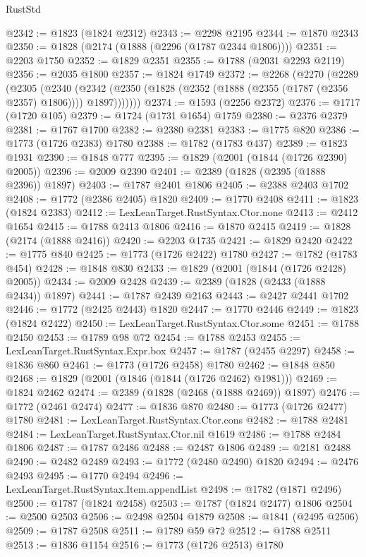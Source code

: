 \begin{lexlean}{RustStd}
\begin{coremodule}
@2342 := @1823 (@1824 @2312)
@2343 := @2298 @2195
@2344 := @1870 @2343
@2350 := @1828 (@2174 (@1888 (@2296 (@1787 @2344 @1806))))
@2351 := @2203 @1750
@2352 := @1829 @2351
@2355 := @1788 (@2031 @2293 @2119)
@2356 := @2035 @1800
@2357 := @1824 @1749
@2372 := @2268
    (@2270
      (@2289
        (@2305
          (@2340
            (@2342 (@2350 (@1828 (@2352 (@1888 (@2355 (@1787 (@2356 @2357) @1806)))) @1897)))))))
@2374 := @1593 (@2256 @2372)
@2376 := @1717 (@1720 @105)
@2379 := @1724 (@1731 @1654) @1759
@2380 := @2376 @2379
@2381 := @1767 @1700
@2382 := @2380 @2381
@2383 := @1775 @820
@2386 := @1773 (@1726 @2383) @1780
@2388 := @1782 (@1783 @437)
@2389 := @1823 @1931
@2390 := @1848 @777
@2395 := @1829 (@2001 (@1844 (@1726 @2390) @2005))
@2396 := @2009 @2390
@2401 := @2389 (@1828 (@2395 (@1888 @2396)) @1897)
@2403 := @1787 @2401 @1806
@2405 := @2388 @2403 @1702
@2408 := @1772 (@2386 @2405) @1820
@2409 := @1770 @2408
@2411 := @1823 (@1824 @2383)
@2412 := LexLeanTarget.RustSyntax.Ctor.none
@2413 := @2412 @1654
@2415 := @1788 @2413 @1806
@2416 := @1870 @2415
@2419 := @1828 (@2174 (@1888 @2416))
@2420 := @2203 @1735
@2421 := @1829 @2420
@2422 := @1775 @840
@2425 := @1773 (@1726 @2422) @1780
@2427 := @1782 (@1783 @454)
@2428 := @1848 @830
@2433 := @1829 (@2001 (@1844 (@1726 @2428) @2005))
@2434 := @2009 @2428
@2439 := @2389 (@1828 (@2433 (@1888 @2434)) @1897)
@2441 := @1787 @2439 @2163
@2443 := @2427 @2441 @1702
@2446 := @1772 (@2425 @2443) @1820
@2447 := @1770 @2446
@2449 := @1823 (@1824 @2422)
@2450 := LexLeanTarget.RustSyntax.Ctor.some
@2451 := @1788 @2450
@2453 := @1789 @98 @72
@2454 := @1788 @2453
@2455 := LexLeanTarget.RustSyntax.Expr.box
@2457 := @1787 (@2455 @2297)
@2458 := @1836 @860
@2461 := @1773 (@1726 @2458) @1780
@2462 := @1848 @850
@2468 := @1829 (@2001 (@1846 (@1844 (@1726 @2462) @1981)))
@2469 := @1824 @2462
@2474 := @2389 (@1828 (@2468 (@1888 @2469)) @1897)
@2476 := @1772 (@2461 @2474)
@2477 := @1836 @870
@2480 := @1773 (@1726 @2477) @1780
@2481 := LexLeanTarget.RustSyntax.Ctor.cons
@2482 := @1788 @2481
@2484 := LexLeanTarget.RustSyntax.Ctor.nil @1619
@2486 := @1788 @2484 @1806
@2487 := @1787 @2486
@2488 := @2487 @1806
@2489 := @2181 @2488
@2490 := @2482 @2489
@2493 := @1772 (@2480 @2490) @1820
@2494 := @2476 @2493
@2495 := @1770 @2494
@2496 := LexLeanTarget.RustSyntax.Item.appendList
@2498 := @1782 (@1871 @2496)
@2500 := @1787 (@1824 @2458)
@2503 := @1787 (@1824 @2477) @1806
@2504 := @2500 @2503
@2506 := @2498 @2504 @1879
@2508 := @1841 (@2495 @2506)
@2509 := @1787 @2508
@2511 := @1789 @59 @72
@2512 := @1788 @2511
@2513 := @1836 @1154
@2516 := @1773 (@1726 @2513) @1780

\end{coremodule}
\end{lexlean}
